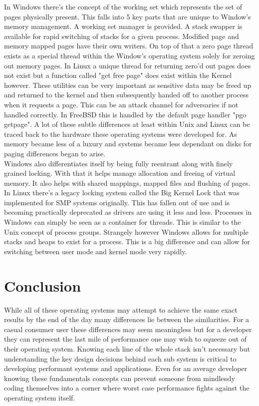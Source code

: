 \documentclass[letterpaper,10pt,draftclsnofoot,onecolumn]{IEEEtran}
\begin{document}
In Windows there's the concept of the working set which represents the set of pages physically present. This falls into 5 key parts that are unique to Window’s memory management. A working set manager is provided. A stack swapper is available for rapid switching of stacks for a given process. Modified page and memory mapped pages have their own writers. On top of that a zero page thread exists as a special thread within the Window’s operating system solely for zeroing out memory pages. In Linux a unique thread for returning zero’d out pages does not exist but a function called "get free page" does exist within the Kernel however. \cite{love} These utilities can be very important as sensitive data may be freed up and returned to the kernel and then subsequently handed off to another process when it requests a page. This can be an attack channel for adversaries if not handled correctly. In FreeBSD this is handled by the default page handler "pgo getpage". \cite{mccusick} A lot of these subtle differences at least within Unix and Linux can be traced back to the hardware these operating systems were developed for. As memory became less of a luxury and systems became less dependant on disks for paging differences began to arise.\\

Windows also differentiates itself by being fully reentrant along with finely grained locking. With that it helps manage allocation and freeing of virtual memory. It also helps with shared mappings, mapped files and flushing of pages. In Linux there's a legacy locking system called the Big Kernel Lock that was implemented for SMP systems originally. This has fallen out of use and is becoming practically deprecated as drivers are using it less and less. \cite{love} Processes in Windows can simply be seen as a container for threads. This is similar to the Unix concept of process groups. Strangely however Windows allows for multiple stacks and heaps to exist for a process. This is a big difference and can allow for switching between user mode and kernel mode very rapidly.\\
\section{Conclusion}
While all of these operating systems may attempt to achieve the same exact results by the end of the day many differences lie between the similarities. For a casual consumer user these differences may seem meaningless but for a developer they can represent the last mile of performance one may wish to squeeze out of their operating system. Knowing each line of the whole stack isn’t necessary but understanding the key design decisions behind each sub system is critical to developing performant systems and applications. Even for an average developer knowing these fundamentals concepts can prevent someone from mindlessly coding themselves into a corner where worst case performance fights against the operating system itself.\\


\end{document}
